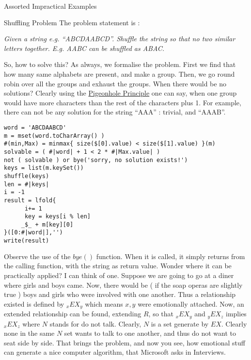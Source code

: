 \begin{section}{Assorted Impractical Examples}
\begin{subsection}{Shuffling Problem}
The problem statement is :

\emph{Given a string e.g. ``ABCDAABCD''. Shuffle the string so that no two similar letters together. 
E.g. AABC can be shuffled as ABAC.}

So, how to solve this? As always, we formalise the problem. 
First we find that how many same alphabets are present, and make a group.
Then, we go round robin over all the groups and exhaust the groups.
When there would be no solutions? Clearly using the \href{https://en.wikipedia.org/wiki/Pigeonhole\_principle}{Pigeonhole Principle} 
one can say, when one group would have more characters than the rest of the characters plus 1.
For example, there can not be any solution for the string ``AAA'' : trivial, and ``AAAB''.

\begin{center}\begin{minipage}{\linewidth}
\begin{lstlisting}[style=JexlStyle]
word = 'ABCDAABCD'
m = mset(word.toCharArray() )
#(min,Max) = minmax{ size($[0].value) < size($[1].value) }(m)
solvable = ( #|word| + 1 < 2 * #|Max.value| )
not ( solvable ) or bye('sorry, no solution exists!')
keys = list(m.keySet())
shuffle(keys)
len = #|keys|
i = -1 
result = lfold{ 
      i+= 1 
      key = keys[i % len]  
     _$_ + m[key][0]           
}([0:#|word|],'')
write(result)
\end{lstlisting}  
\end{minipage}\end{center}
Observe the use of the $bye()$ function. When it is called, it simply returns
from the calling function, with the string as return value.
Wonder where it can be practically applied? I can think of one.
Suppose we are going to go at a diner where girls and boys came. 
Now, there would be ( if the soap operas are slightly true ) boys and girls who were
involved with one another. Thus a relationship existed is defined by $_xEX_y$ 
which means $x,y$ were emotionally attached. 
Now, an extended relationship can be found, extending $R$, so that $_xEX_y$ and $_yEX_z$ 
implies $_xEX_z$ where $N$ stands for do not talk. Clearly, $N$ is a set generate by $EX$.
Clearly none in the same $N$ set wants to talk to one another, and thus
do not want to seat side by side. That brings the problem, and 
now you see, how emotional stuff can generate a nice computer algorithm, 
that Microsoft asks in Interviews.


\end{subsection}
\end{section}
